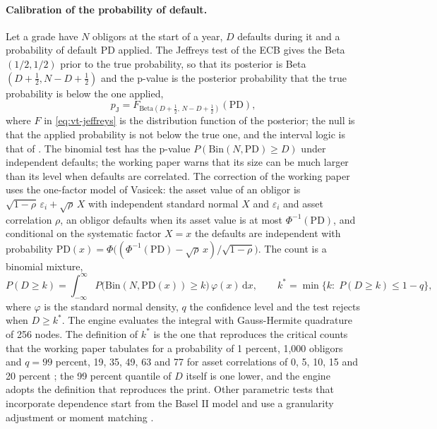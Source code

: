 \paragraph{Calibration of the probability of default.} Let a grade have $N$ obligors at the start of a year, $D$ defaults during it and a probability
of default $\mathrm{PD}$ applied. The Jeffreys test of the ECB gives the Beta$(1/2,1/2)$ prior to the true probability, so that its posterior is
Beta$(D+\tfrac12,N-D+\tfrac12)$ and the p-value is the posterior probability that the true probability is below the one applied,
\begin{equation}
  p_{\mathrm{J}}=F_{\mathrm{Beta}(D+\frac12,\,N-D+\frac12)}(\mathrm{PD}),
  \label{eq:vt-jeffreys}
\end{equation}
where $F$ in \cref{eq:vt-jeffreys} is the distribution function of the posterior; the null is that the applied probability is not below the true one, and the interval logic is
that of \citet{ratings:brown2001}. The binomial test has the p-value $P(\mathrm{Bin}(N,\mathrm{PD})\ge D)$ under independent defaults; the working paper
warns that its size can be much larger than its level when defaults are correlated. The correction of the working paper uses the one-factor model of
Vasicek: the asset value of an obligor is $\sqrt{1-\rho}\,\varepsilon_i+\sqrt{\rho}\,X$ with independent standard normal $X$ and $\varepsilon_i$ and
asset correlation $\rho$, an obligor defaults when its asset value is at most $\Phi^{-1}(\mathrm{PD})$, and conditional on the systematic factor $X=x$ the
defaults are independent with probability $\mathrm{PD}(x)=\Phi\bigl((\Phi^{-1}(\mathrm{PD})-\sqrt{\rho}\,x)/\sqrt{1-\rho}\bigr)$. The count is a binomial mixture,
\begin{equation}
  P(D\ge k)=\int_{-\infty}^{\infty}P\bigl(\mathrm{Bin}(N,\mathrm{PD}(x))\ge k\bigr)\,\varphi(x)\,\mathrm{d}x,\qquad
  k^{*}=\min\{k:\;P(D\ge k)\le 1-q\},
  \label{eq:vt-mixture}
\end{equation}
where $\varphi$ is the standard normal density, $q$ the confidence level and the test rejects when $D\ge k^{*}$. The engine evaluates the integral with
Gauss-Hermite quadrature of 256 nodes. The definition of $k^{*}$ is the one that reproduces the critical counts that the working paper tabulates for a
probability of 1 percent, 1,000 obligors and $q=99$ percent, 19, 35, 49, 63 and 77 for asset correlations of 0, 5, 10, 15 and 20 percent
\citep{credit-scoring:bcbswp14}; the 99 percent quantile of $D$ itself is one lower, and the engine adopts the definition that reproduces the print. Other parametric tests that incorporate dependence start from the Basel II model and use a granularity adjustment or moment matching \citep{validation-tests:tasche2003}.
